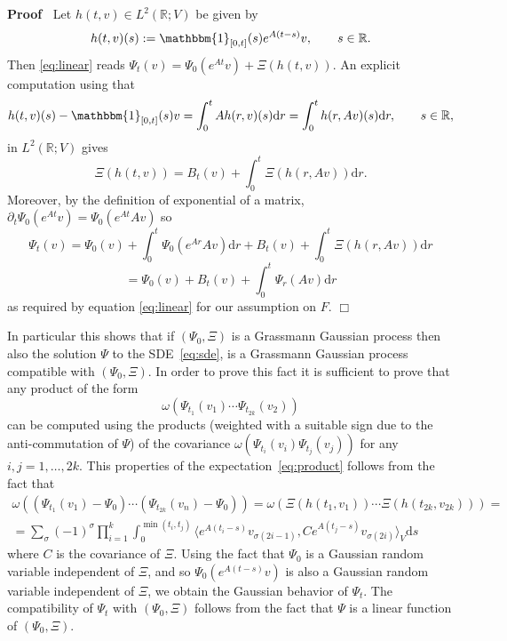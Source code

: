 \documentclass{article}
\newcommand{\assign}{:=}
\newcommand{\mathd}{\mathrm{d}}
\newenvironment{proof}{\noindent\textbf{Proof\ }}{\hspace*{\fill}$\Box$\medskip}
\begin{document}
\begin{proof}
  Let $h (t, v) \in L^2 (\mathbb{R}; V)$ be given by
  \[ h (t, v) (s) \assign \mathbbm{1}_{[0, t]} (s) e^{A (t - s)} v, \qquad s
     \in \mathbb{R}. \]
  Then {\eqref{eq:linear}} reads $\Psi_t (v) = \Psi_0 (e^{A t} v) + \Xi (h (t,
  v))$. An explicit computation using that
  \[ h (t, v) (s) -\mathbbm{1}_{[0, t]} (s) v = \int_0^t A h (r, v) (s) \mathd
     r = \int_0^t h (r, A v) (s) \mathd r, \qquad s \in \mathbb{R}, \]
  in $L^2 (\mathbb{R}; V)$ gives
  \[ \Xi (h (t, v)) = B_t (v) + \int_0^t \Xi (h (r, A v)) \mathd r. \]
  Moreover, by the definition of exponential of a matrix, $\partial_t \Psi_0
  (e^{A t} v) = \Psi_0 (e^{A t} A v)$ so
  \[ \Psi_t (v) = \Psi_0 (v) + \int_0^t \Psi_0 (e^{A r} A v) \mathd r + B_t
     (v) + \int_0^t \Xi (h (r, A v)) \mathd r \]
  \[ = \Psi_0 (v) + B_t (v) + \int_0^t \Psi_r (A v) \mathd r \]
  as required by equation {\eqref{eq:linear}} for our assumption on $F$.
\end{proof}

\begin{remark}
  In particular this shows that if $(\Psi_0, \Xi)$ is a Grassmann Gaussian
  process then also the solution $\Psi$ to the SDE~{\eqref{eq:sde}}, is a
  Grassmann Gaussian process compatible with $(\Psi_0, \Xi)$. In order to
  prove this fact it is sufficient to prove that any product of the form
  \begin{equation}
    \omega (\Psi_{t_1} (v_1) \cdots \Psi_{t_{2 k}} (v_2)) \label{eq:product}
  \end{equation}
  can be computed using the products (weighted with a suitable sign due to the
  anti-commutation of $\Psi$) of the covariance $\omega (\Psi_{t_i} (v_i)
  \Psi_{t_j} (v_j))$ for any $i, j = 1, \ldots, 2 k$. This properties of the
  expectation~{\eqref{eq:product}} follows from the fact that
  \[ \begin{array}{c}
       \omega ((\Psi_{t_1} (v_1) - \Psi_0) \cdots (\Psi_{t_{2 k}} (v_n) -
       \Psi_0)) = \omega (\Xi (h (t_1, v_1)) \cdots \Xi (h (t_{2 k}, v_{2
       k}))) =\\
       = \sum_{\sigma} (- 1)^{\sigma} \prod_{i = 1}^k \int_0^{\min (t_i, t_j)}
       \langle e^{A (t_i - s)} v_{\sigma (2 i - 1)}, C e^{A (t_j - s)}
       v_{\sigma (2 i)} \rangle_V \mathd s
     \end{array} \]
  where $C$ is the covariance of $\Xi$. Using the fact that $\Psi_0$ is a
  Gaussian random variable independent of $\Xi$, and so $\Psi_0 (e^{A (t - s)}
  v)$ is also a Gaussian random variable independent of $\Xi$, we obtain the
  Gaussian behavior of $\Psi_t$. The compatibility of $\Psi_t$ with $(\Psi_0,
  \Xi)$ follows from the fact that $\Psi$ is a linear function of $(\Psi_0,
  \Xi) .$
\end{remark}
\end{document}

